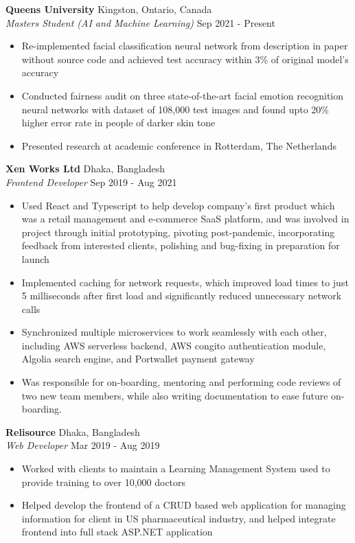 \documentclass[a4paper]{article}
\begin{document}
\textbf{Queen\textquotesingle{}s University} \hfill Kingston, Ontario, Canada\\
\textit{Master\textquotesingle{}s Student (AI and Machine Learning)} \hfill Sep 2021 - Present\\
\vspace{-1mm}
\begin{itemize} \itemsep 1pt
	\item Re-implemented facial classification neural network from description in paper without source code and achieved test accuracy within 3\% of original model's accuracy
	\item Conducted fairness audit on three state-of-the-art facial emotion recognition neural networks with dataset of 108,000 test images and found upto 20\% higher error rate in people of darker skin tone
	\item Presented research at academic conference in Rotterdam, The Netherlands
\end{itemize}

\textbf{Xen Works Ltd} \hfill Dhaka, Bangladesh\\
\textit{Frontend Developer} \hfill Sep 2019 - Aug 2021\\
\vspace{-1mm}
\begin{itemize} \itemsep 1pt
	\item Used React and Typescript to help develop company's first product which was a retail management and e-commerce SaaS platform, and was involved in project through initial prototyping, pivoting post-pandemic, incorporating feedback from interested clients, polishing and bug-fixing in preparation for launch
	\item Implemented caching for network requests, which improved load times to just 5 milliseconds after first load and significantly reduced unnecessary network calls
	\item Synchronized multiple microservices to work seamlessly with each other, including AWS serverless backend, AWS congito authentication module, Algolia search engine, and Portwallet payment gateway
	\item Was responsible for on-boarding, mentoring and performing code reviews of two new team members, while also writing documentation to ease future on-boarding.
\end{itemize}

\textbf{Relisource} \hfill Dhaka, Bangladesh\\
\textit{Web Developer} \hfill Mar 2019 - Aug 2019\\
\vspace{-1mm}
\begin{itemize} \itemsep 1pt
	\item Worked with clients to maintain a Learning Management System used to provide training to over 10,000 doctors
	\item Helped develop the frontend of a CRUD based web application for managing information for client in US pharmaceutical industry, and helped integrate frontend into full stack ASP.NET application
\end{itemize}
\end{document}
